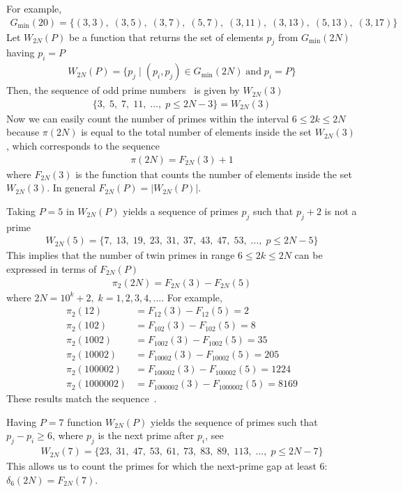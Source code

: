 For example,
\begin{align*}
    G_{\min}(20) = \{
    (3,3),\;
    (3,5),\;
    (3,7),\;
    (5,7),\;
    (3,11),\;
    (3,13),\;
    (5,13),\;
    (3,17)
    \}
\end{align*}
Let $W_{2N}(P)$ be a function that returns the set of elements $p_j$ from $G_{\min} (2N)$ having $p_i=P$
\begin{align*}
    W_{2N}(P) = \{p_j \mid (p_i, p_j) \in G_{\min} (2N) \; \mathrm{and} \; p_i = P \}
\end{align*}
Then, the sequence of odd prime numbers~\cite{oeis:A065091} is given by $W_{2N}(3)$
\begin{align*}
    \{ 3, \; 5, \; 7, \; 11, \; \dots, \; p \leq 2N - 3\} = W_{2N}(3)
\end{align*}
Now we can easily count the number of primes within the interval $6 \leq 2k \leq 2N$ because $\pi(2N)$ is equal to
the total number of elements inside the set $W_{2N}(3)$, which corresponds to the sequence~\cite{oeis_A000720}
\begin{align*}
    \pi(2N) = F_{2N}(3) + 1
\end{align*}
where $F_{2N}(3)$ is the function that counts the number of elements inside the set $W_{2N}(3)$.
In general $F_{2N}(P) = |W_{2N}(P)|$.

Taking $P=5$ in $W_{2N}(P)$ yields a sequence of primes $p_j$ such that $p_j+2$ is not a prime~\cite{oeis:A049591}
\begin{align*}
    W_{2N}(5) = \{ 7, \; 13, \; 19, \; 23, \; 31, \; 37, \; 43, \; 47, \; 53, \; \dots, \;  p \leq 2N - 5 \}
\end{align*}
This implies that the number of twin primes in range $6 \leq 2k \leq 2N$ can be expressed in terms of $F_{2N}(P)$
\begin{align*}
    \pi_2 (2N) = F_{2N}(3) - F_{2N}(5)
\end{align*}
where $2N=10^k+2, \; k=1,2,3,4,\dots$.
For example,
\begin{align*}
    \pi_2 (12) &= F_{12}(3) - F_{12}(5) = 2 \\
    \pi_2 (102) &= F_{102}(3) - F_{102}(5) = 8 \\
    \pi_2 (1002) &= F_{1002}(3) - F_{1002}(5) = 35 \\
    \pi_2 (10002) &= F_{10002}(3) - F_{10002}(5) = 205 \\
    \pi_2 (100002) &= F_{100002}(3) - F_{100002}(5) = 1224 \\
    \pi_2 (1000002) &= F_{1000002}(3) - F_{1000002}(5) = 8169
\end{align*}
These results match the sequence~\cite{oeis_A007508}.

Having $P=7$ function $W_{2N}(P)$ yields the sequence of primes such that $p_j-p_i \geq 6$,
where $p_j$ is the next prime after $p_i$, see~\cite{oeis:A124582}
\begin{align*}
    W_{2N}(7) = \{ 23, \; 31, \;  47, \; 53, \; 61, \;  73, \; 83, \; 89, \; 113, \; \dots, \; p \leq 2N-7 \}
\end{align*}
This allows us to count the primes for which the next-prime gap at least 6: $\delta_6(2N) = F_{2N}(7)$.
